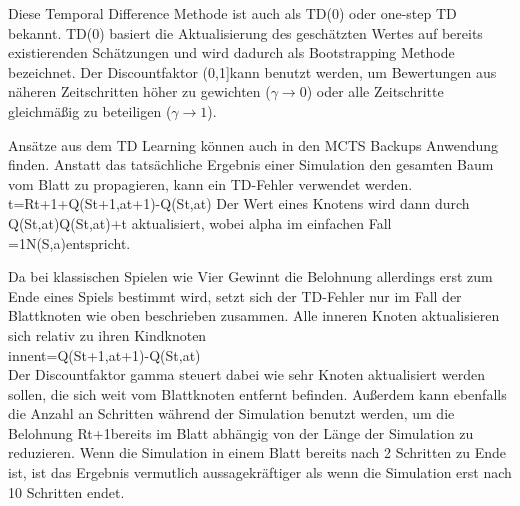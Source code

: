 Diese Temporal Difference Methode ist auch als TD(0) oder one-step TD bekannt. TD(0) basiert die Aktualisierung des geschätzten Wertes auf bereits existierenden Schätzungen und wird dadurch als Bootstrapping Methode bezeichnet. Der Discountfaktor (0,1]kann benutzt werden, um Bewertungen aus näheren Zeitschritten höher zu gewichten ($\gamma \rightarrow 0$) oder alle Zeitschritte gleichmäßig zu beteiligen ($\gamma \rightarrow 1$).\\
\par
Ansätze aus dem TD Learning können auch in den MCTS Backups Anwendung finden. Anstatt das tatsächliche Ergebnis einer Simulation den gesamten Baum vom Blatt zu propagieren, kann ein TD-Fehler verwendet werden.
t=Rt+1+Q(St+1,at+1)-Q(St,at)
Der Wert eines Knotens wird dann durch
Q(St,at)Q(St,at)+t
aktualisiert, wobei alpha im einfachen Fall =1N(S,a)entspricht.\\
\par
Da bei klassischen Spielen wie Vier Gewinnt die Belohnung allerdings erst zum Ende eines Spiels bestimmt wird, setzt sich der TD-Fehler nur im Fall der Blattknoten wie oben beschrieben zusammen. Alle inneren Knoten aktualisieren sich relativ zu ihren Kindknoten\\
innent=Q(St+1,at+1)-Q(St,at)\\
Der Discountfaktor gamma steuert dabei wie sehr Knoten aktualisiert werden sollen, die sich weit vom Blattknoten entfernt befinden. Außerdem kann ebenfalls die Anzahl an Schritten während der Simulation benutzt werden, um die Belohnung Rt+1bereits im Blatt abhängig von der Länge der Simulation zu reduzieren. Wenn die Simulation in einem Blatt bereits nach 2 Schritten zu Ende ist, ist das Ergebnis vermutlich aussagekräftiger als wenn die Simulation erst nach 10 Schritten endet. 
